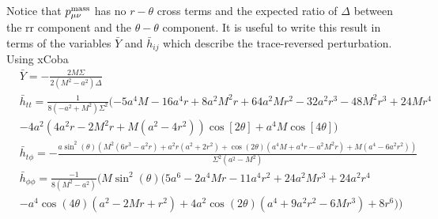 \documentclass[aps,prd,amsmath,showpacs,amssymb,superscriptaddress,nofootinbib,longbibliography,eqsecnum,preprintnumbers]{revtex4-1}
\begin{document}
Notice that $p_{\mu\nu}^{\rm mass}$ has no $r-\theta$ cross terms and the expected ratio of $\Delta$ between the rr component and the $\theta-\theta$ component. It is useful to write this result in terms of the variables $\bar Y$ and $\bar h_{ij}$  which describe the trace-reversed perturbation. Using xCoba
\begin{align}
&\bar Y=-\frac{2M\Sigma}{2 \left(M^2-a^2\right)\Delta} \nonumber \\
&\bar h_{tt}=\frac{1}{8 (-a^2 + M^2) \Sigma^2}(-5 a^4 M - 16 a^4 r + 8 a^2 M^2 r + 64 a^2 M r^2 - 32 a^2 r^3 - 
 48 M^2 r^3 + 24 M r^4 \nonumber \\
 & - 4 a^2 (4 a^2 r - 2 M^2 r + M (a^2 - 4 r^2)) \cos[2 \theta] + 
 a^4 M \cos[4 \theta]) \nonumber \\
 &
\bar h_{t\phi}= -\frac{a \sin ^2(\theta ) \left(M^2 \left(6 r^3-a^2 r\right)+a^2 r \left(a^2+2 r^2\right)+\cos (2 \theta ) \left(a^4 M+a^4 r-a^2 M^2 r\right)+M \left(a^4-6 a^2 r^2\right)\right)}{\Sigma ^2 \left(a^2-M^2\right)} \nonumber \\
& \bar h_{\phi\phi}=\frac{-1}{8(M^2-a^2)}(M \sin ^2(\theta ) (5 a^6-2 a^4 M r-11 a^4 r^2+24 a^2 M r^3+24 a^2 r^4
\nonumber \\ 
&-a^4 \cos (4 \theta ) \left(a^2-2 M r+r^2\right)+4 a^2 \cos (2 \theta ) \left(a^4+9 a^2 r^2-6 M r^3\right)+8 r^6))
\end{align}
\end{document}
